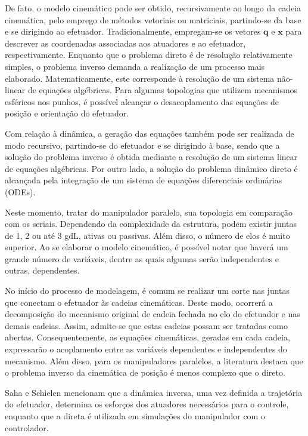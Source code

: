 \documentclass[]{politex}
\begin{document}
De fato, o modelo cinemático pode ser obtido, recursivamente ao longo da cadeia cinemática, pelo emprego de métodos vetoriais ou matriciais, partindo-se da base e se dirigindo ao efetuador. Tradicionalmente, empregam-se os vetores $\mathbf{q}$ e $\mathbf{x}$ para descrever as coordenadas associadas aos atuadores e ao efetuador, respectivamente. Enquanto que o problema direto é de resolução relativamente simples, o problema inverso demanda a realização de um processo mais elaborado. Matematicamente, este corresponde à resolução de um sistema não-linear de equações algébricas. Para algumas topologias que utilizem mecanismos esféricos nos punhos, é possível alcançar o desacoplamento das equações de posição e orientação do efetuador.

Com relação à dinâmica, a geração das equações também pode ser realizada de modo recursivo, partindo-se do efetuador e se dirigindo à base, sendo que a solução do problema inverso é obtida mediante a resolução de um sistema linear de equações algébricas. Por outro lado, a solução do problema dinâmico direto é alcançada pela integração de um sistema de equações diferenciais ordinárias (ODEs).

Neste momento, tratar do manipulador paralelo, sua topologia em comparação com os seriais. Dependendo da complexidade da estrutura, podem existir juntas de 1, 2 ou até 3 gdL, ativas ou passivas. Além disso, o número de elos é muito superior. Ao se elaborar o modelo cinemático, é possível notar que haverá um grande número de variáveis, dentre as quais algumas serão independentes e outras, dependentes. 

No início do processo de modelagem, é comum  se realizar um corte nas juntas que conectam o efetuador às cadeias cinemáticas. Deste modo, ocorrerá a decomposição do mecanismo original de cadeia fechada no elo do efetuador e nas demais cadeias. Assim, admite-se que estas cadeias possam ser tratadas como abertas. Consequentemente, as equações cinemáticas, geradas em cada cadeia, expressarão o acoplamento entre as variáveis dependentes e independentes do mecanismo. Além disso, para os manipuladores paralelos, a literatura destaca que o problema inverso da cinemática de posição é menos complexo que o direto. 

Saha e Schielen \cite{saha} mencionam que a dinâmica inversa, uma vez definida a trajetória do efetuador, determina os esforços dos atuadores necessários para o controle, enquanto que a direta é utilizada em simulações do manipulador com o controlador.
\end{document}
